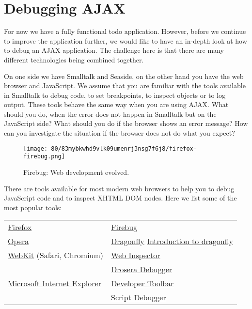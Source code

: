 \documentclass[a4paper,10pt,twoside]{book}
\begin{document}
\section{Debugging AJAX}
\label{book:web20:scriptaculous:debugging}

For now we have a fully functional todo application. However, before we continue to improve the application further, we would like to have an in-depth look at how to debug an AJAX application. The challenge here is that there are many different technologies being combined together.

On one side we have Smalltalk and Seaside, on the other hand you have the web browser and JavaScript. We assume that you are familiar with the tools available in Smalltalk to debug code, to set breakpoints, to inspect objects or to log output. These tools behave the same way when you are using AJAX. What should you do, when the error does not happen in Smalltalk but on the JavaScript side? What should you do if the browser shows an error message? How can you investigate the situation if the browser does not do what you expect?

\begin{figure}[h!tbp]
	\begin{center}
		\texttt{[image: 80/83mybkwhd9vlk09umenrj3nsg7f6j8/firefox-firebug.png]}
		\caption{Firebug: Web development evolved.\label{book:web20:scriptaculous:debugging:firefoxfirebug}}
	\end{center}
\end{figure}


There are tools available for most modern web browsers to help you to debug JavaScript code and to inspect XHTML DOM nodes. Here we list some of the most popular tools:

\begin{tabularx}{\textwidth}{lX}
 \href{http://www.mozilla.com/firefox}{Firefox} & \href{http://www.getFirebug.com}{Firebug}\\
 \href{http://www.opera.com}{Opera} & \href{http://www.opera.com/dragonfly/}{Dragonfly} \href{http://dev.opera.com/articles/view/introduction-to-opera-dragonfly/}{Introduction to dragonfly}\\
 \href{http://webkit.org}{WebKit} (Safari, Chromium) & \href{http://webkit.org/blog/41/introducing-the-web-inspector}{Web Inspector}\\
 & \href{http://webkit.org/blog/61/introducing-drosera}{Drosera Debugger}\\
 \href{http://www.microsoft.com/windows/downloads/ie/getitnow.mspx}{Microsoft Internet Explorer} & \href{http://www.microsoft.com/downloads/details.aspx?familyid=e59c3964-672d-4511-bb3e-2d5e1db91038}{Developer Toolbar}\\
 & \href{http://www.microsoft.com/downloads/details.aspx?familyid=2f465be0-94fd-4569-b3c4-dffdf19ccd99}{Script Debugger}\\
\end{tabularx}
\end{document}
